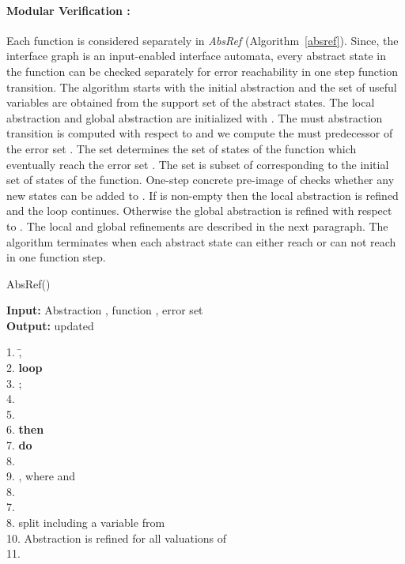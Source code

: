 \documentclass{llncs}
\begin{document}
\paragraph{Modular Verification :} Each function is considered separately  in {\em AbsRef} (Algorithm~\ref{absref}).
Since, the interface graph is an input-enabled interface automata, every abstract state in the 
function can be checked separately for error reachability in one step function transition.
 The algorithm starts with the initial abstraction  and the set of useful variables 
 are obtained from the support set of the abstract states.
The local abstraction  and global abstraction  are initialized with . 
The must abstraction transition is computed with respect to  and we compute the must predecessor  of the error set .
The set  determines the set of states of the function which eventually reach the error
set .
The set  is subset of  corresponding to  the initial set of states of the function.
One-step concrete pre-image  of  checks whether any new states can be 
added to .
If  is non-empty then the local abstraction  is refined and the loop
continues.
Otherwise the global abstraction  is refined with respect to .
The local and global refinements are described in the next paragraph.
The algorithm terminates when each abstract state can either reach  or can not reach  in one
function step. 
\begin{algorithm}[htb]
\caption{AbsRef()} \label{absref}
{\bf Input:} Abstraction , function , error set  \\
 {\bf Output:} updated 
 \vspace*{-1ex}
\begin{tabbing}
1.  \= , \\
2. \>  {\bf loop}\\
3. \>  \quad ; \\
4. \>  \quad \\
5. \>  \quad  \\
6. \>    {\bf then} \\ 
7. \> \quad {}  {\bf do}\\
8. \> \quad \quad {}  \\
9.  \> \quad \quad \quad \quad , where  and \\
8. \>  \\
7. \>  \\ 
8. \>  \quad \quad split including a variable  from \\
10. \> \quad \quad Abstraction  is refined for all valuations of   \\
11. \> \\             
\end{tabbing}
\vspace*{-2ex}
\end{algorithm}
\end{document}
